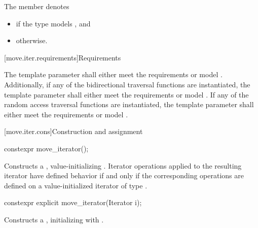 \pnum
The member   denotes
\begin{itemize}
\item
{} if
the type
 models
, and
\item
{} otherwise.
\end{itemize}

[move.iter.requirements]{Requirements}

\pnum
The template parameter  shall either
meet the  requirements
or model .
Additionally, if any of the bidirectional traversal
functions are instantiated, the template parameter shall either
meet the  requirements
or model .
If any of the random access traversal functions are instantiated, the
template parameter shall either
meet the  requirements
or model
.

[move.iter.cons]{Construction and assignment}

%
\begin{itemdecl}
constexpr move_iterator();
\end{itemdecl}

\begin{itemdescr}
\pnum
\effects
Constructs a , value-initializing
. Iterator operations applied to the resulting
iterator have defined behavior if and only if the corresponding operations are defined
on a value-initialized iterator of type .
\end{itemdescr}


%
\begin{itemdecl}
constexpr explicit move_iterator(Iterator i);
\end{itemdecl}

\begin{itemdescr}
\pnum
\effects
Constructs a , initializing
 with .
\end{itemdescr}


